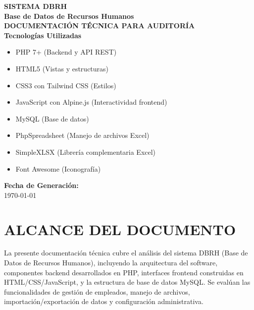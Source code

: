 \documentclass[12pt,a4paper]{article}
\begin{document}
\begin{titlepage}
\begin{center}
{\LARGE \textbf{SISTEMA DBRH}}\\
{\large \textbf{Base de Datos de Recursos Humanos}}\\[2cm]

{\large \textbf{DOCUMENTACIÓN TÉCNICA PARA AUDITORÍA}}\\[1cm]

{\large \textbf{Tecnologías Utilizadas}}\\[0.5cm]
\begin{itemize}
\item PHP 7+ (Backend y API REST)
\item HTML5 (Vistas y estructuras)
\item CSS3 con Tailwind CSS (Estilos)
\item JavaScript con Alpine.js (Interactividad frontend)
\item MySQL (Base de datos)
\item PhpSpreadsheet (Manejo de archivos Excel)
\item SimpleXLSX (Librería complementaria Excel)
\item Font Awesome (Iconografía)
\end{itemize}

\vfill

{\large \textbf{Fecha de Generación:}}\\
{\large \today}

\end{center}
\end{titlepage}

\section{ALCANCE DEL DOCUMENTO}
La presente documentación técnica cubre el análisis del sistema DBRH (Base de Datos de Recursos Humanos), incluyendo la arquitectura del software, componentes backend desarrollados en PHP, interfaces frontend construidas en HTML/CSS/JavaScript, y la estructura de base de datos MySQL. Se evalúan las funcionalidades de gestión de empleados, manejo de archivos, importación/exportación de datos y configuración administrativa.

\end{document}
